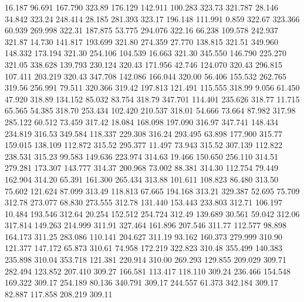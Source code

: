   16.187   96.691  167.790       323.89
 176.129  142.911  100.283       323.73
 321.787   28.146   34.842       323.24
 248.414   28.185  281.393       323.17
 196.148  111.991    0.859       322.67
 323.366   60.939  269.998       322.31
 187.875   53.775  294.076       322.16
  66.238  109.578  242.937       321.87
  14.730  141.817  193.699       321.80
 274.359   27.770  138.815       321.51
 349.960  148.332  173.194       321.30
 254.106  104.539   16.663       321.30
 345.550  146.790  225.270       321.05
 338.628  139.793  230.124       320.43
 171.956   42.746  124.070       320.43
 296.815  107.411  203.219       320.43
 347.708  142.086  166.044       320.00
  56.406  155.532  262.765       319.56
 256.991   79.511  320.366       319.42
 197.813  121.491  115.555       318.99
   9.056   61.450   47.920       318.89
 134.152   85.032   83.754       318.79
 347.701  114.401  235.626       318.77
  11.715   65.565   54.385       318.70
 253.434  102.420  210.537       318.01
  54.666   73.664   87.982       317.98
 285.122   60.512   73.459       317.42
  18.084  168.098  197.090       316.97
 347.741  148.434  234.819       316.53
 349.584  118.337  229.308       316.24
 293.495   63.898  177.900       315.77
 159.015  138.109  112.872       315.52
 295.377   11.497   73.943       315.52
 307.139  112.822  238.531       315.23
  99.583  149.636  223.974       314.63
  19.466  150.650  256.110       314.51
 279.281  173.307  143.777       314.37
 200.968   73.002   88.381       314.30
 112.754   79.449  162.904       314.20
  65.391  161.300  265.434       313.88
 101.611  108.823   86.480       313.50
  75.602  121.624   87.099       313.49
 118.813   67.665  194.168       313.21
 329.387   52.695   75.709       312.78
 273.077   68.830  273.555       312.78
 131.440  153.443  233.803       312.71
 106.197   10.484  193.546       312.64
  20.254  152.512  254.724       312.49
 139.689   30.561   59.042       312.06
 317.814  149.263  214.999       311.91
 327.464  161.896  207.546       311.77
 112.577   98.898  164.173       311.25
 283.086  110.141  204.627       311.19
  93.162  160.373  279.999       310.90
 121.377  147.172   65.873       310.61
  74.958  172.219  322.823       310.48
 355.499  140.383  235.898       310.04
 353.718  121.381  220.914       310.00
 269.293  129.855  209.029       309.71
 282.494  123.852  207.410       309.27
 166.581  113.417  118.110       309.24
 236.466  154.548  169.322       309.17
 254.189   80.136  340.791       309.17
 244.557   61.373  342.184       309.17
  82.887  117.858  208.219       309.11
